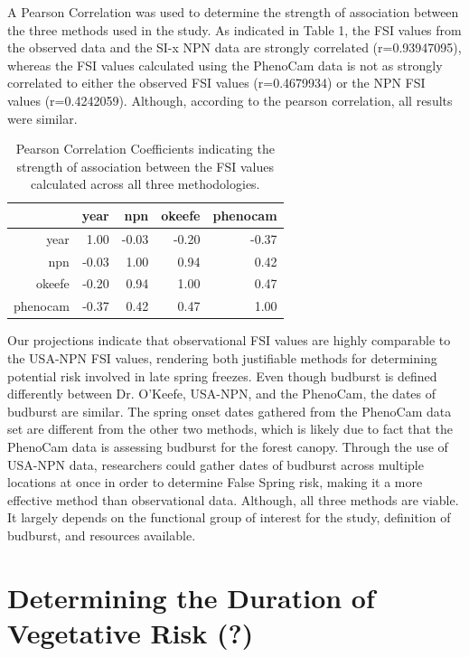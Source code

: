 \documentclass{article}\usepackage[]{graphicx}\usepackage[]{color}
\begin{document}
A Pearson Correlation was used to determine the strength of association between the three methods used in the study. As indicated in Table 1, the FSI values from the observed data and the SI-x NPN data are strongly correlated (r=0.93947095), whereas the FSI values calculated using the PhenoCam data is not as strongly correlated to either the observed FSI values (r=0.4679934) or the NPN FSI values (r=0.4242059). Although, according to the pearson correlation, all results were similar. 

\begin{table}[ht]
\centering
\caption{Pearson Correlation Coefficients indicating the strength of association between the FSI values calculated across all three methodologies.} 
\begin{tabular}{rrrrr}
  \hline
 & year & npn & okeefe & phenocam \\ 
  \hline
year & 1.00 & -0.03 & -0.20 & -0.37 \\ 
  npn & -0.03 & 1.00 & 0.94 & 0.42 \\ 
  okeefe & -0.20 & 0.94 & 1.00 & 0.47 \\ 
  phenocam & -0.37 & 0.42 & 0.47 & 1.00 \\ 
   \hline
\end{tabular}
\end{table}


Our projections indicate that observational FSI values are highly comparable to the USA-NPN FSI values, rendering both justifiable methods for determining potential risk involved in late spring freezes. Even though budburst is defined differently between Dr. O'Keefe, USA-NPN, and the PhenoCam, the dates of budburst are similar. The spring onset dates gathered from the PhenoCam data set are different from the other two methods, which is likely due to fact that the PhenoCam data is assessing budburst for the forest canopy. Through the use of USA-NPN data, researchers could gather dates of budburst across multiple locations at once in order to determine False Spring risk, making it a more effective method than observational data. Although, all three methods are viable. It largely depends on the functional group of interest for the study, definition of budburst, and resources available. 

\section{Determining the Duration of Vegetative Risk (?)}
\end{document}
